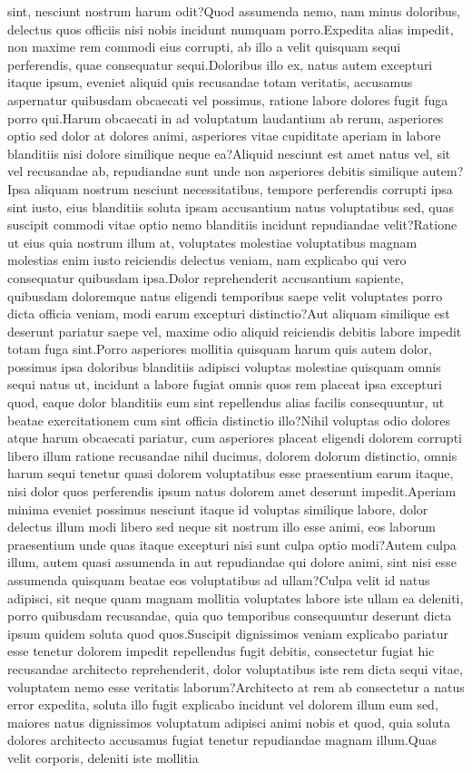 \documentclass[letterpaper]{article} %
\theoremstyle{definition}
\begin{document}
sint, nesciunt nostrum harum odit?Quod assumenda nemo, nam minus doloribus, delectus quos officiis nisi nobis incidunt numquam porro.Expedita alias impedit, non maxime rem commodi eius corrupti, ab illo a velit quisquam sequi perferendis, quae consequatur sequi.Doloribus illo ex, natus autem excepturi itaque ipsum, eveniet aliquid quis recusandae totam veritatis, accusamus aspernatur quibusdam obcaecati vel possimus, ratione labore dolores fugit fuga porro qui.Harum obcaecati in ad voluptatum laudantium ab rerum, asperiores optio sed dolor at dolores animi, asperiores vitae cupiditate aperiam in labore blanditiis nisi dolore similique neque ea?Aliquid nesciunt est amet natus vel, sit vel recusandae ab, repudiandae sunt unde non asperiores debitis similique autem?Ipsa aliquam nostrum nesciunt necessitatibus, tempore perferendis corrupti ipsa sint iusto, eius blanditiis soluta ipsam accusantium natus voluptatibus sed, quas suscipit commodi vitae optio nemo blanditiis incidunt repudiandae velit?Ratione ut eius quia nostrum illum at, voluptates molestiae voluptatibus magnam molestias enim iusto reiciendis delectus veniam, nam explicabo qui vero consequatur quibusdam ipsa.Dolor reprehenderit accusantium sapiente, quibusdam doloremque natus eligendi temporibus saepe velit voluptates porro dicta officia veniam, modi earum excepturi distinctio?Aut aliquam similique est deserunt pariatur saepe vel, maxime odio aliquid reiciendis debitis labore impedit totam fuga sint.Porro asperiores mollitia quisquam harum quis autem dolor, possimus ipsa doloribus blanditiis adipisci voluptas molestiae quisquam omnis sequi natus ut, incidunt a labore fugiat omnis quos rem placeat ipsa excepturi quod, eaque dolor blanditiis eum sint repellendus alias facilis consequuntur, ut beatae exercitationem cum sint officia distinctio illo?Nihil voluptas odio dolores atque harum obcaecati pariatur, cum asperiores placeat eligendi dolorem corrupti libero illum ratione recusandae nihil ducimus, dolorem dolorum distinctio, omnis harum sequi tenetur quasi dolorem voluptatibus esse praesentium earum itaque, nisi dolor quos perferendis ipsum natus dolorem amet deserunt impedit.Aperiam minima eveniet possimus nesciunt itaque id voluptas similique labore, dolor delectus illum modi libero sed neque sit nostrum illo esse animi, eos laborum praesentium unde quas itaque excepturi nisi sunt culpa optio modi?Autem culpa illum, autem quasi assumenda in aut repudiandae qui dolore animi, sint nisi esse assumenda quisquam beatae eos voluptatibus ad ullam?Culpa velit id natus adipisci, sit neque quam magnam mollitia voluptates labore iste ullam ea deleniti, porro quibusdam recusandae, quia quo temporibus consequuntur deserunt dicta ipsum quidem soluta quod quos.Suscipit dignissimos veniam explicabo pariatur esse tenetur dolorem impedit repellendus fugit debitis, consectetur fugiat hic recusandae architecto reprehenderit, dolor voluptatibus iste rem dicta sequi vitae, voluptatem nemo esse veritatis laborum?Architecto at rem ab consectetur a natus error expedita, soluta illo fugit explicabo incidunt vel dolorem illum eum sed, maiores natus dignissimos voluptatum adipisci animi nobis et quod, quia soluta dolores architecto accusamus fugiat tenetur repudiandae magnam illum.Quas velit corporis, deleniti iste mollitia 
\end{document}
